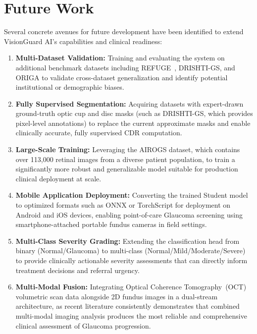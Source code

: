 \documentclass[conference]{IEEEtran}
\begin{document}
\section{Future Work}

Several concrete avenues for future development have been identified to extend VisionGuard AI's capabilities and clinical readiness:

\begin{enumerate}
    \item \textbf{Multi-Dataset Validation:} Training and evaluating the system on additional benchmark datasets including REFUGE~\cite{orlando2020}, DRISHTI-GS, and ORIGA to validate cross-dataset generalization and identify potential institutional or demographic biases.
    
    \item \textbf{Fully Supervised Segmentation:} Acquiring datasets with expert-drawn ground-truth optic cup and disc masks (such as DRISHTI-GS, which provides pixel-level annotations) to replace the current approximate masks and enable clinically accurate, fully supervised CDR computation.
    
    \item \textbf{Large-Scale Training:} Leveraging the AIROGS dataset, which contains over 113,000 retinal images from a diverse patient population, to train a significantly more robust and generalizable model suitable for production clinical deployment at scale.
    
    \item \textbf{Mobile Application Deployment:} Converting the trained Student model to optimized formats such as ONNX or TorchScript for deployment on Android and iOS devices, enabling point-of-care Glaucoma screening using smartphone-attached portable fundus cameras in field settings.
    
    \item \textbf{Multi-Class Severity Grading:} Extending the classification head from binary (Normal/Glaucoma) to multi-class (Normal/Mild/Moderate/Severe) to provide clinically actionable severity assessments that can directly inform treatment decisions and referral urgency.
    
    \item \textbf{Multi-Modal Fusion:} Integrating Optical Coherence Tomography~(OCT) volumetric scan data alongside 2D fundus images in a dual-stream architecture, as recent literature consistently demonstrates that combined multi-modal imaging analysis produces the most reliable and comprehensive clinical assessment of Glaucoma progression.
\end{enumerate}
\end{document}
